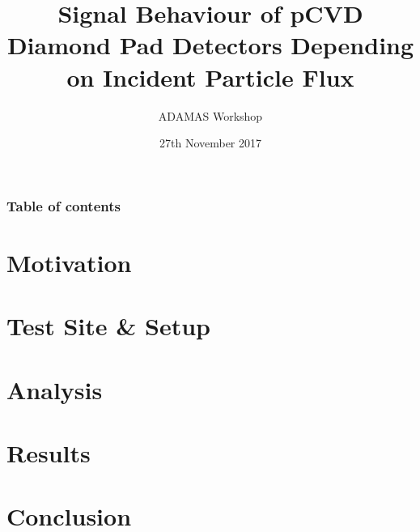 \documentclass[9pt, xcolor=dvipsnames]{beamer}
\title[Diamond Pad Detectors]{Signal Behaviour of pCVD Diamond Pad Detectors Depending on Incident Particle Flux}
\subtitle{ADAMAS Workshop}
\date{27th November 2017}
\begin{document}


\begin{frame}%
	\frametitle{Table of contents}
	\tableofcontents[hideallsubsections]   %
\end{frame}

\section{Motivation}


\section{Test Site \& Setup}


\section{Analysis}


\section{Results}


\section{Conclusion}






\end{document}
